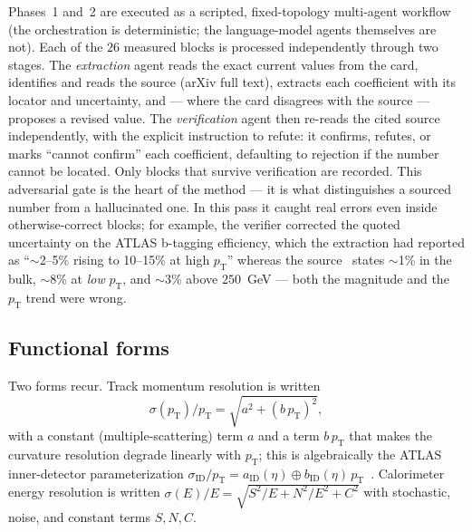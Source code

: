 \documentclass[11pt,a4paper]{article}
\newcommand{\eqA}{\sigma(p_\mathrm{T})/p_\mathrm{T}=\sqrt{a^2+(b\,p_\mathrm{T})^2}}
\begin{document}
Phases~1 and~2 are executed as a scripted, fixed-topology multi-agent workflow
(the orchestration is deterministic; the language-model agents themselves are
not). Each of the
$26$ measured blocks is processed independently through two stages. The
\emph{extraction} agent reads the exact current values from the card, identifies
and reads the source (arXiv full text), extracts each coefficient with its
locator and uncertainty, and --- where the card disagrees with the source ---
proposes a revised value. The \emph{verification} agent then re-reads the cited
source independently, with the explicit instruction to refute: it confirms,
refutes, or marks ``cannot confirm'' each coefficient, defaulting to rejection
if the number cannot be located. Only blocks that survive verification are
recorded. This adversarial gate is the heart of the method --- it is what
distinguishes a sourced number from a hallucinated one. In this pass it caught
real errors even inside otherwise-correct blocks; for example, the verifier
corrected the quoted uncertainty on the ATLAS b-tagging efficiency, which the
extraction had reported as ``$\sim$2--5\% rising to 10--15\% at high
$p_\mathrm{T}$'' whereas the source~\cite{atlas-btag} states $\sim$1\% in the
bulk, $\sim$8\% at \emph{low} $p_\mathrm{T}$, and $\sim$3\% above
$250$~GeV --- both the magnitude and the $p_\mathrm{T}$ trend were wrong.

\subsection{Functional forms}
Two forms recur. Track momentum resolution is written
\begin{equation}
  \eqA,
  \label{eq:momres}
\end{equation}
with a constant (multiple-scattering) term $a$ and a term $b\,p_\mathrm{T}$ that
makes the curvature resolution degrade linearly with $p_\mathrm{T}$; this is
algebraically the ATLAS inner-detector parameterization
$\sigma_\mathrm{ID}/p_\mathrm{T}=a_\mathrm{ID}(\eta)\oplus
b_\mathrm{ID}(\eta)\,p_\mathrm{T}$~\cite{atlas-muonres7}. Calorimeter energy
resolution is written $\sigma(E)/E=\sqrt{S^2/E+N^2/E^2+C^2}$ with stochastic,
noise, and constant terms $S,N,C$.
\end{document}
